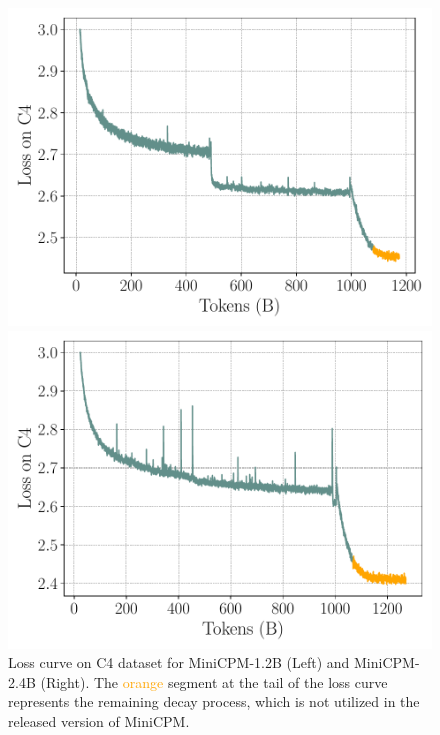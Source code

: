 \begin{figure}[htbp]
    \centering
    \begin{minipage}{0.48\linewidth}
        \centering
        \includegraphics[width=0.9\linewidth]{Fig/1.2B_c4_loss_smoothed.pdf}
    \end{minipage}
    \hfill %
    \begin{minipage}{0.48\linewidth}
        \centering
        \includegraphics[width=0.9\linewidth]{Fig/2.4B_c4_loss_smoothed.pdf}
    \end{minipage}
     \caption{Loss curve on C4 dataset for MiniCPM-1.2B (Left) and MiniCPM-2.4B (Right). The  \textcolor{orange}{orange} segment at the tail of the loss curve represents the remaining decay process, which is not utilized in the released version of MiniCPM.}
        \label{fig:loss_c4}
\end{figure}

